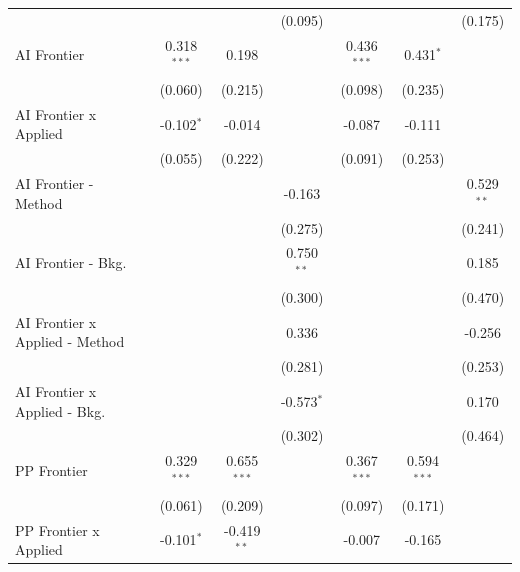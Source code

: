 \begin{tabular}{lcccccc}
                                  &                &                & (0.095)        &                &                & (0.175)\\   
   AI Frontier                    & 0.318$^{***}$  & 0.198          &                & 0.436$^{***}$  & 0.431$^{*}$    &   \\   
                                  & (0.060)        & (0.215)        &                & (0.098)        & (0.235)        &   \\   
   AI Frontier x Applied          & -0.102$^{*}$   & -0.014         &                & -0.087         & -0.111         &   \\   
                                  & (0.055)        & (0.222)        &                & (0.091)        & (0.253)        &   \\   
   AI Frontier - Method           &                &                & -0.163         &                &                & 0.529$^{**}$\\   
                                  &                &                & (0.275)        &                &                & (0.241)\\   
   AI Frontier - Bkg.             &                &                & 0.750$^{**}$   &                &                & 0.185\\   
                                  &                &                & (0.300)        &                &                & (0.470)\\   
   AI Frontier x Applied - Method &                &                & 0.336          &                &                & -0.256\\   
                                  &                &                & (0.281)        &                &                & (0.253)\\   
   AI Frontier x Applied - Bkg.   &                &                & -0.573$^{*}$   &                &                & 0.170\\   
                                  &                &                & (0.302)        &                &                & (0.464)\\   
   PP Frontier                    & 0.329$^{***}$  & 0.655$^{***}$  &                & 0.367$^{***}$  & 0.594$^{***}$  &   \\   
                                  & (0.061)        & (0.209)        &                & (0.097)        & (0.171)        &   \\   
   PP Frontier x Applied          & -0.101$^{*}$   & -0.419$^{**}$  &                & -0.007         & -0.165         &   \\   

\end{tabular}
